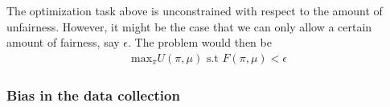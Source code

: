 The optimization task above is unconstrained with respect to the amount of unfairness. 
However, it might be the case that we can only allow a certain amount of fairness, say $\epsilon$. 
The problem would then be 
\begin{align*}
    \text{max}_{\pi} U(\pi,\mu) \text{ s.t } F(\pi,\mu) < \epsilon
\end{align*}



\subsubsection*{Bias in the data collection}

\subsubsection*{}
\subsubsection*{}

